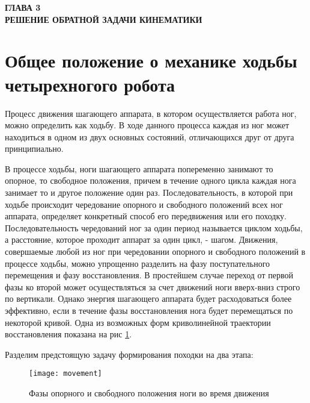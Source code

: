 
\begin{center}
	\textbf{\large ГЛАВА 3 \\ РЕШЕНИЕ ОБРАТНОЙ ЗАДАЧИ КИНЕМАТИКИ}
\end{center}


\section{Общее положение о механике ходьбы четырехногого робота}\label{C3_1}
Процесс движения шагающего аппарата, в котором осуществляется работа ног, можно определить как ходьбу. В ходе данного процесса каждая из ног может находиться в одном из двух основных состояний, отличающихся друг от друга принципиально.

В процессе ходьбы, ноги шагающего аппарата попеременно занимают то опорное, то свободное положения, причем в течение одного цикла каждая нога занимает то и другое положение один раз. Последовательность, в которой при ходьбе происходит чередование опорного и свободного положений всех ног аппарата, определяет конкретный способ его передвижения или его походку. Последовательность чередований ног за один период называется циклом ходьбы, а расстояние, которое проходит аппарат за один цикл, - шагом.
Движения, совершаемые любой из ног при чередовании опорного и свободного положений в процессе ходьбы, можно упрощенно разделить на фазу поступательного перемещения и фазу восстановления. В простейшем случае переход от первой фазы ко второй может осуществляться за счет движений ноги вверх-вниз строго по вертикали. Однако энергия шагающего аппарата будет расходоваться более эффективно, если в течение фазы восстановления нога будет перемещаться по некоторой кривой. Одна из возможных форм криволинейной траектории восстановления показана на рис \ref{movement}. 

Разделим предстоящую задачу формирования походки на два этапа:


\begin{figure}[h!]
	\begin{center}
		\texttt{[image: movement]}
		\caption{Фазы опорного и свободного положения ноги во время движения}
		\label{movement}
	\end{center}
\end{figure}


